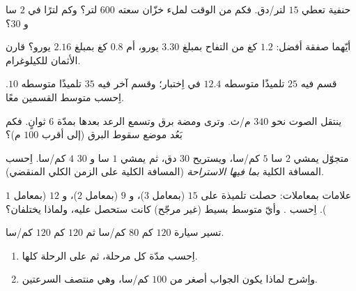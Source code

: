 \begin{exercise}[$\star$]\label{exo:g8:speed:4}
حنفية تعطي $15$ لتر/دق. فكم من الوقت لملء خزّان سعته $600$ لتر؟ وكم
لترًا في $2$ سا و $30$؟
\end{exercise}

\begin{exercise}[$\star$]\label{exo:g8:speed:5}
أيّهما صفقة أفضل: $1.2$ كغ من التفاح بمبلغ $3.30$ يورو، أم
$0.8$ كغ بمبلغ $2.16$ يورو؟ قارن الأثمان للكيلوغرام.
\end{exercise}

\begin{exercise}[$\star$]\label{exo:g8:speed:6}
قسم فيه $25$ تلميذًا متوسطه $12.4$ في اِختبار؛ وقسم آخر
فيه $35$ تلميذًا متوسطه $10$. اِحسب متوسط
القسمين معًا.
\end{exercise}

\begin{exercise}[$\star$]\label{exo:g8:speed:7}
ينتقل الصوت  نحو $340$ م/ث. وترى ومضة برق وتسمع
الرعد بعدها بمدّة $6$ ثوانٍ. فكم بَعُد موضع سقوط البرق
(إلى أقرب $100$ م)؟
\end{exercise}

\begin{exercise}[$\star\star$]\label{exo:g8:speed:8}
متجوّل يمشي $2$ سا  $5$ كم/سا، ويستريح $30$ دق، ثم يمشي $1$ سا و $30$
 $4$ كم/سا. اِحسب المسافة الكلية 
\emph{بما فيها الاستراحة} (المسافة الكلية على الزمن الكلي المنقضي).
\end{exercise}

\begin{exercise}[$\star\star$]\label{exo:g8:speed:9}
علامات بمعاملات: حصلت تلميذة على $15$ (بمعامل $3$)، و $9$
(بمعامل $2$)، و $12$ (بمعامل $1$). اِحسب . وأيّ متوسط بسيط (غير مرجّح) كانت ستحصل عليه، ولماذا
يختلفان؟
\end{exercise}

\begin{exercise}[$\star\star$]\label{exo:g8:speed:10}
تسير سيارة $120$ كم  $80$ كم/سا ثم $120$ كم  $120$ كم/سا.
\begin{enumerate}
  \item اِحسب مدّة كل مرحلة، ثم  على
        الرحلة كلها.
  \item واِشرح لماذا يكون الجواب أصغر من $100$ كم/سا، وهي منتصف
        السرعتين.
\end{enumerate}
\end{exercise}

